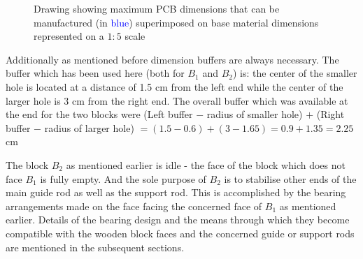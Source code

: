 \begin{figure}[h]
    \begin{center}
    \end{center} 
    \begin{center}   
    \end{center}
    \caption{Drawing showing maximum PCB dimensions that can be manufactured (in \textcolor{blue}{blue}) superimposed on base material dimensions represented on a $1:5$ scale}
    \label{fig:xaxis}
\end{figure}

Additionally as mentioned before dimension buffers are always necessary. The buffer which has been used here (both for $B_{1}$ and $B_{2}$) is: the center of the smaller hole is located at a distance of 1.5 cm from the left end while the center of the larger hole is 3 cm from the right end. The overall buffer which was available at the end for the two blocks were
(Left buffer $-$ radius of smaller hole) $+$ (Right buffer $-$ radius of larger hole)
$= (1.5 - 0.6) + (3 - 1.65)
= 0.9 + 1.35
= 2.25$ cm

The block $B_{2}$ as mentioned earlier is idle - the face of the block which does not face $B_{1}$ is fully empty. And the sole purpose of $B_{2}$ is to stabilise other ends of the main guide rod as well as the support rod. This is accomplished by the bearing arrangements made on the face facing the concerned face of $B_{1}$ as mentioned earlier. Details of the bearing design and the means through which they become compatible with the wooden block faces and the concerned guide or support rods are mentioned in the subsequent sections.


